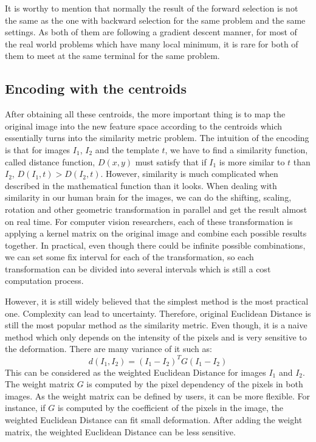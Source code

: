 It is worthy to mention that normally the result of the forward selection is not the same as the one with backward selection for the same problem and the same settings. As both of them are following a gradient descent manner, for most of the real world problems which have many local minimum, it is rare for both of them to meet at the same terminal for the same problem.

\subsection{Encoding with the centroids}
After obtaining all these centroids, the more important thing is to map the original image into the new feature space according to the centroids which essentially turns into the similarity metric problem. The intuition of the encoding is that for images $I_1$, $I_2$ and the template $t$, we have to find a similarity function, called distance function, $D(x,y)$ must satisfy that if $I_1$ is more similar to $t$ than $I_2$, $D(I_1,t) > D(I_2,t)$. However, similarity is much complicated when described in the mathematical function than it looks. When dealing with similarity in our human brain for the images, we can do the shifting, scaling, rotation and other geometric transformation in parallel and get the result almost on real time. For computer vision researchers, each of these transformation is applying a kernel matrix on the original image and combine each possible results together. In practical, even though there could be infinite possible combinations, we can set some fix interval for each of the transformation, so each transformation can be divided into several intervals which is still a cost computation process.

However, it is still widely believed that the simplest method is the most practical one. Complexity can lead to uncertainty. Therefore, original Euclidean Distance is still the most popular method as the similarity metric. Even though, it is a naive method which only depends on the intensity of the pixels and is very sensitive to the deformation. There are many variance of it such as\cite{buades2005non}\cite{maurer2003linear}:
 \begin{equation}\label{eq:edv}
   d({I_1},{I_2}) = {\left( {{I_1} - {I_2}} \right)^T}G\left( {{I_1} - {I_2}} \right)
 \end{equation}
This can be considered as the weighted Euclidean Distance for images $I_1$ and $I_2$. The weight matrix $G$ is computed by the pixel dependency of the pixels in both images. As the weight matrix can be defined by users, it can be more flexible. For instance, if $G$ is computed by the coefficient of the pixels in the image, the weighted Euclidean Distance can fit small deformation. After adding the weight matrix, the weighted Euclidean Distance can be less sensitive.

